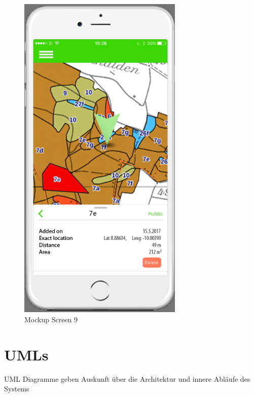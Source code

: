 \begin{figure}[h]
\centering
    \includegraphics[width=0.7\textwidth]{mockup1-9}
    \caption{Mockup Screen 9}
    \label{fig:mesh9}
\end{figure}



\section{UMLs}
UML Diagramme geben Auskunft \"uber die Architektur und innere Abl\"aufe des Systems

